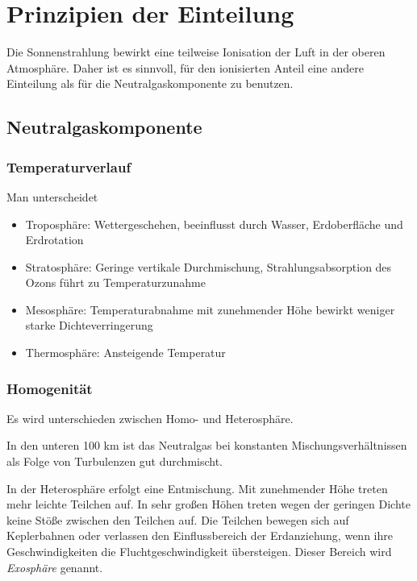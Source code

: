 \documentclass[
  a4paper,
  DIV=11]{scrreprt}
\providecommand{\tightlist}{%
  \setlength{\itemsep}{0pt}\setlength{\parskip}{0pt}}\usepackage{longtable,booktabs,array}
\begin{document}
\hypertarget{prinzipien-der-einteilung}{%
\section{Prinzipien der Einteilung}\label{prinzipien-der-einteilung}}

Die Sonnenstrahlung bewirkt eine teilweise Ionisation der Luft in der
oberen Atmosphäre. Daher ist es sinnvoll, für den ionisierten Anteil
eine andere Einteilung als für die Neutralgaskomponente zu benutzen.

\hypertarget{neutralgaskomponente}{%
\subsection{Neutralgaskomponente}\label{neutralgaskomponente}}

\hypertarget{temperaturverlauf}{%
\subsubsection{Temperaturverlauf}\label{temperaturverlauf}}

Man unterscheidet

\begin{itemize}
\tightlist
\item
  Troposphäre: Wettergeschehen, beeinflusst durch Wasser, Erdoberfläche
  und Erdrotation
\item
  Stratosphäre: Geringe vertikale Durchmischung, Strahlungsabsorption
  des Ozons führt zu Temperaturzunahme
\item
  Mesosphäre: Temperaturabnahme mit zunehmender Höhe bewirkt weniger
  starke Dichteverringerung
\item
  Thermosphäre: Ansteigende Temperatur
\end{itemize}

\hypertarget{homogenituxe4t}{%
\subsubsection{Homogenität}\label{homogenituxe4t}}

Es wird unterschieden zwischen Homo- und Heterosphäre.

In den unteren 100 km ist das Neutralgas bei konstanten
Mischungsverhältnissen als Folge von Turbulenzen gut durchmischt.

In der Heterosphäre erfolgt eine Entmischung. Mit zunehmender Höhe
treten mehr leichte Teilchen auf. In sehr großen Höhen treten wegen der
geringen Dichte keine Stöße zwischen den Teilchen auf. Die Teilchen
bewegen sich auf Keplerbahnen oder verlassen den Einflussbereich der
Erdanziehung, wenn ihre Geschwindigkeiten die Fluchtgeschwindigkeit
übersteigen. Dieser Bereich wird \emph{Exosphäre} genannt.
\end{document}
